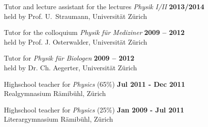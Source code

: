 \documentclass[margin,line]{resume}
\begin{document}
\begin{resume}
\begin{list2}
  \item Tutor and lecture assistant for the lectures \emph{Physik I/II}
    \hfill {\bf 2013/2014} \\
    {\small
      held by Prof. U.~Straumann, 
      Universität Zürich
    }

  \item Tutor for the colloquium \emph{Physik für Mediziner}
    \hfill {\bf 2009 -- 2012} \\
    {\small
      held by Prof. J. Osterwalder, 
      Universität Zürich
    }

  \item Tutor for \emph{Physik für Biologen}
    \hfill {\bf 2009 -- 2012} \\
    {\small
      held by Dr. Ch. Aegerter,
      Universität Zürich
    }

  \item Highschool teacher for \emph{Physics} (65\%)
    \hfill {\bf Jul 2011 - Dec 2011}\\
    {\small
      Realgymnasium Rämibühl, Zürich
    }

  \item Highschool teacher for \emph{Physics} (25\%)
    \hfill {\bf Jan 2009 - Jul 2011}\\
    {\small
      Literargymnasium Rämibühl, Zürich
    }

\end{list2}




\end{resume}
\end{document}
